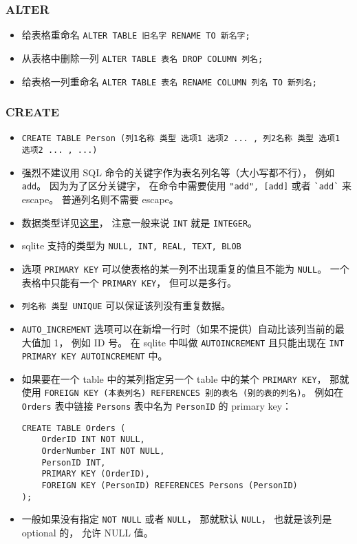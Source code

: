 \subsubsection{ALTER}
\begin{itemize}
\item 给表格重命名 \verb|ALTER TABLE 旧名字 RENAME TO 新名字;|
\item 从表格中删除一列 \verb|ALTER TABLE 表名 DROP COLUMN 列名;|
\item 给表格一列重命名 \verb|ALTER TABLE 表名 RENAME COLUMN 列名 TO 新列名;|
\end{itemize}

\subsubsection{CREATE}
\begin{itemize}
\item \verb|CREATE TABLE Person (列1名称 类型 选项1 选项2 ... , 列2名称 类型 选项1 选项2 ... , ...)|
\item 强烈不建议用 SQL 命令的关键字作为表名列名等（大小写都不行）， 例如 \verb|add|。 因为为了区分关键字， 在命令中需要使用 \verb|"add", [add]| 或者 \verb|`add`| 来 escape。 普通列名则不需要 escape。
\item 数据类型详见\href{https://www.w3schools.com/sql/sql_datatypes.asp}{这里}， 注意一般来说 \verb|INT| 就是 \verb|INTEGER|。
\item sqlite 支持的类型为 \verb|NULL, INT, REAL, TEXT, BLOB|
\item 选项 \verb|PRIMARY KEY| 可以使表格的某一列不出现重复的值且不能为 \verb|NULL|。 一个表格中只能有一个 \verb|PRIMARY KEY|， 但可以是多行。
\item \verb|列名称 类型 UNIQUE| 可以保证该列没有重复数据。
\item \verb|AUTO_INCREMENT| 选项可以在新增一行时（如果不提供）自动比该列当前的最大值加 1， 例如 ID 号。 在 sqlite 中叫做 \verb|AUTOINCREMENT| 且只能出现在 \verb|INT PRIMARY KEY AUTOINCREMENT| 中。
\item 如果要在一个 table 中的某列指定另一个 table 中的某个 \verb|PRIMARY KEY|， 那就使用 \verb|FOREIGN KEY (本表列名) REFERENCES 别的表名 (别的表的列名)|。 例如在 \verb|Orders| 表中链接 \verb|Persons| 表中名为 \verb|PersonID| 的 primary key：
\begin{lstlisting}[language=none]
CREATE TABLE Orders (
    OrderID INT NOT NULL,
    OrderNumber INT NOT NULL,
    PersonID INT,
    PRIMARY KEY (OrderID),
    FOREIGN KEY (PersonID) REFERENCES Persons (PersonID)
);
\end{lstlisting}
\item 一般如果没有指定 \verb|NOT NULL| 或者 \verb|NULL|， 那就默认 \verb|NULL|， 也就是该列是 optional 的， 允许 NULL 值。
\end{itemize}

